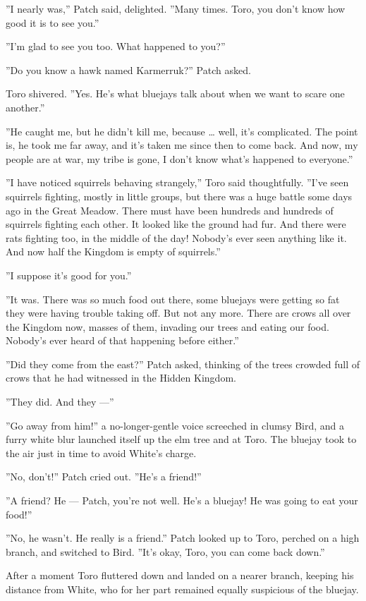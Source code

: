 \documentclass[12pt]{book}
\begin{document}
''I nearly was,'' Patch said, delighted. ''Many times. Toro, you don't
know how good it is to see you.''

''I'm glad to see you too. What happened to you?''

''Do you know a hawk named Karmerruk?'' Patch asked.

Toro shivered. ''Yes. He's what bluejays talk about when we want to
scare one another.''

''He caught me, but he didn't kill me, because \ldots{} well, it's
complicated. The point is, he took me far away, and it's taken me
since then to come back. And now, my people are at war, my tribe is
gone, I don't know what's happened to everyone.''

''I have noticed squirrels behaving strangely,'' Toro said
thoughtfully. ''I've seen squirrels fighting, mostly in little groups,
but there was a huge battle some days ago in the Great Meadow. There
must have been hundreds and hundreds of squirrels fighting each
other. It looked like the ground had fur. And there were rats fighting
too, in the middle of the day! Nobody's ever seen anything like
it. And now half the Kingdom is empty of squirrels.''

''I suppose it's good for you.''

''It was. There was so much food out there, some bluejays were getting
so fat they were having trouble taking off. But not any more. There
are crows all over the Kingdom now, masses of them, invading our trees
and eating our food. Nobody's ever heard of that happening before
either.''

''Did they come from the east?'' Patch asked, thinking of the trees
crowded full of crows that he had witnessed in the Hidden Kingdom.

''They did. And they ---''

''Go away from him!'' a no-longer-gentle voice screeched in clumsy
Bird, and a furry white blur launched itself up the elm tree and at
Toro. The bluejay took to the air just in time to avoid White's
charge.

''No, don't!'' Patch cried out. ''He's a friend!''

''A friend? He --- Patch, you're not well. He's a bluejay! He was
going to eat your food!''

''No, he wasn't. He really is a friend.'' Patch looked up to Toro,
perched on a high branch, and switched to Bird. ''It's okay, Toro, you
can come back down.''

After a moment Toro fluttered down and landed on a nearer branch,
keeping his distance from White, who for her part remained equally
suspicious of the bluejay.
\end{document}
